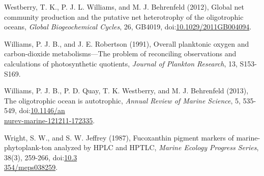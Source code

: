 \begin{singlespace}
{{Westberry, T. K., P. J. L. Williams, and M. J. Behrenfeld (2012), Global net community production and the putative net heterotrophy of the oligotrophic oceans, \emph{Global Biogeochemical Cycles}, 26, GB4019, doi:\href{http://dx.doi.org/10.1029/2011GB004094}{10.1029/2011GB004094}.

Williams, P. J. B., and J. E. Robertson (1991), Overall planktonic oxygen and carbon-dioxide metabolisms---The problem of reconciling observations and calculations of photosynthetic quotients, \emph{Journal of Plankton Research}, 13, S153-S169.

Williams, P. J. B., P. D. Quay, T. K. Westberry, and M. J. Behrenfeld (2013), The oligotrophic ocean is autotrophic, \emph{Annual Review of Marine Science}, 5, 535-549, doi:\href{http://dx.doi.org/10.1146/annurev-marine-121211-172335}{10.1146/an\\nurev-marine-121211-172335}.

Wright, S. W., and S. W. Jeffrey (1987), Fucoxanthin pigment markers of marine-phytoplank-ton analyzed by HPLC and HPTLC, \emph{Marine Ecology Progress Series}, 38(3), 259-266, doi:\href{http://dx.doi.org/10.3354/meps038259}{10.3\\354/meps038259}.}}
\end{singlespace}

\clearpage

